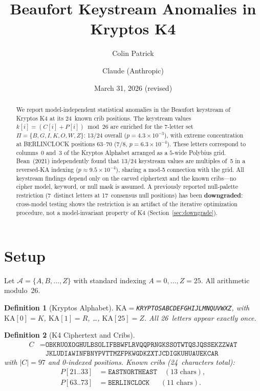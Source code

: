 \documentclass[11pt]{article}
\title{Beaufort Keystream Anomalies in Kryptos K4}
\author{Colin Patrick \and Claude (Anthropic)}
\date{March 31, 2026 (revised)}
\newtheorem{definition}{Definition}
\theoremstyle{remark}
\begin{document}
\maketitle

\begin{abstract}
We report model-independent statistical anomalies in the Beaufort
keystream of Kryptos K4 at its 24~known crib positions.
The keystream values $k[i] = (C[i] + P[i]) \bmod 26$ are enriched
for the 7-letter set $\Pi = \{B,G,I,K,O,W,Z\}$: 13/24 overall
($p = 4.3 \times 10^{-3}$), with extreme concentration at
BERLINCLOCK positions 63--70 (7/8, $p = 6.3 \times 10^{-4}$).
These letters correspond to columns~0 and~3 of the Kryptos Alphabet
arranged as a $5$-wide Polybius grid.
Bean~(2021) independently found that 13/24 keystream values are
multiples of~5 in a reversed-KA indexing ($p \approx 9.5 \times 10^{-4}$),
sharing a mod-5 connection with the grid.
All keystream findings depend only on the carved ciphertext and the
known cribs---no cipher model, keyword, or null mask is assumed.
A previously reported null-palette restriction (7~distinct letters at
17~consensus null positions) has been \textbf{downgraded}: cross-model
testing shows the restriction is an artifact of the iterative
optimization procedure, not a model-invariant property of K4
(Section~\ref{sec:downgrade}).
\end{abstract}

\section{Setup}

Let $\mathcal{A} = \{A, B, \ldots, Z\}$ with standard indexing $A{=}0,
\ldots, Z{=}25$.  All arithmetic modulo~26.

\begin{definition}[Kryptos Alphabet]
$\mathrm{KA} = {}${\small\texttt{KRYPTOSABCDEFGHIJLMNQUVWXZ}}, with
$\mathrm{KA}[0]{=}K$, $\mathrm{KA}[1]{=}R$, \ldots, $\mathrm{KA}[25]{=}Z$.
All 26~letters appear exactly once.
\end{definition}

\begin{definition}[K4 Ciphertext and Cribs]
{\small
\begin{align*}
C &= \texttt{OBKRUOXOGHULBSOLIFBBWFLRVQQPRNGKSSOTWTQSJQSSEKZZWAT} \\
  &\phantom{{}={}}\texttt{JKLUDIAWINFBNYPVTTMZFPKWGDKZXTJCDIGKUHUAUEKCAR}
\end{align*}
}
with $|C| = 97$ and 0-indexed positions.  Known cribs (24~characters total):
\begin{align*}
P[21..33] &= \texttt{EASTNORTHEAST} \quad (13\text{ chars}), \\
P[63..73] &= \texttt{BERLINCLOCK} \quad\;\; (11\text{ chars}).
\end{align*}
\end{definition}
\end{document}
